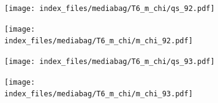 \documentclass[
  11pt,
  letterpaper,
]{scrreprt}
\begin{document}
\begin{figure}

\begin{minipage}{0.50\linewidth}

\begin{figure}[H]

{\centering \texttt{[image: index\_files/mediabag/T6\_m\_chi/qs\_92.pdf]}

}


\end{figure}%

\end{minipage}%
%
\begin{minipage}{0.50\linewidth}

\begin{figure}[H]

{\centering \texttt{[image: index\_files/mediabag/T6\_m\_chi/m\_chi\_92.pdf]}

}


\end{figure}%

\end{minipage}%

\end{figure}%

\begin{figure}

\begin{minipage}{0.50\linewidth}

\begin{figure}[H]

{\centering \texttt{[image: index\_files/mediabag/T6\_m\_chi/qs\_93.pdf]}

}


\end{figure}%

\end{minipage}%
%
\begin{minipage}{0.50\linewidth}

\begin{figure}[H]

{\centering \texttt{[image: index\_files/mediabag/T6\_m\_chi/m\_chi\_93.pdf]}

}


\end{figure}%

\end{minipage}%

\end{figure}%
\end{document}
